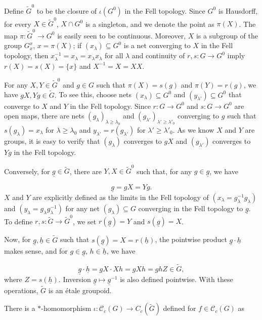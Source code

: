 \documentclass[a4paper, 12pt]{amsart}
\theoremstyle{definition}
\theoremstyle{remark}
\numberwithin{equation}{section}
\begin{document}
Define $\tilde{G}^{0}$ to be the closure of $\iota(G^{0})$ in the Fell topology. Since $G^{0}$ is Hausdorff, for every $X\in \tilde{G}^{0}$, $X\cap G^{0}$ is a singleton, and we denote the point as $\pi(X)$. The map $\pi:\tilde{G}^{0}\to G^{0}$ is easily seen to be continuous. Moreover, $X$ is a subgroup of the group $G^{x}_{x}$, $x = \pi(X)$; if $(x_{\lambda})\subseteq G^{0}$ is a net converging to $X$ in the Fell topology, then $x_{\lambda}^{-1} = x_{\lambda} =  x_{\lambda}x_{\lambda}$ for all $\lambda$ and continuity of $r,s:G\to G^{0}$ imply $r(X) = s(X) = \{x\}$ and $X^{-1} = X = XX$.

 For any $X, Y\in \tilde{G}^{0}$ and $g\in G$ such that $\pi(X) = s(g)$ and $\pi(Y) = r(g)$, we have $gX, Yg\in \tilde{G}.$ To see this, choose nets $(x_{\lambda})\subseteq G^{0}$ and $(y_{\lambda'})\subseteq G^{0}$ that converge to $X$ and $Y$ in the Fell topology. Since $r:G\to G^{0}$ and $s:G\to G^{0}$ are open maps, there are nets $(g_{\lambda})_{\lambda\geq \lambda_{0}}$ and $(g_{\lambda'})_{\lambda'\geq \lambda'_{0}}$ converging to $g$ such that $s(g_{\lambda}) = x_{\lambda}$ for $\lambda\geq \lambda_{0}$ and $y_{\lambda'} = r(g_{\lambda'})$ for $\lambda'\geq \lambda'_{0}$. As we know $X$ and $Y$ are groups, it is easy to verify that $(g_{\lambda})$ converges to $gX$ and $(g_{\lambda'})$ converges to $Yg$ in the Fell topology.

Conversely, for $\underline{g}\in \tilde{G}$, there are $Y,X\in \tilde{G}^{0}$ such that, for any $g\in \underline{g}$, we have 

$$\underline{g} = gX = Y g.$$ $X$ and $Y$ are explicitly defined as the limits in the Fell topology of $(x_{\lambda} = g^{-1}_{\lambda}g_{\lambda})$ and $(y_{\lambda} = g_{\lambda}g^{-1}_{\lambda})$ for any net $(g_{\lambda})\subseteq G$ converging in the Fell topology to $\underline{g}$. To define $r,s:\tilde{G}\to \tilde{G}^{0}$, we set $r(\underline{g}) = Y$ and $s(\underline{g}) = X$.

Now, for $\underline{g},\underline{h}\in \tilde{G}$ such that $s(\underline{g})= X = r(\underline{h})$, the pointwise product $\underline{g}\cdot \underline{h}$ makes sense, and for $g\in\underline{g}$, $h\in\underline{h}$, we have

$$\underline{g}\cdot \underline{h} = gX\cdot Xh  = gXh = ghZ\in \tilde{G},$$ where $Z = s(\underline{h})$. Inversion $\underline{g}\mapsto \underline{g}^{-1}$ is also defined pointwise. With these operations, $\tilde{G}$ is an \'etale groupoid.

There is a $*$-homomorphism $\iota:\mathscr{C}_{c}(G)\to C_{c}(\tilde{G})$ defined for $f\in \mathscr{C}_{c}(G)$ as 
\end{document}
